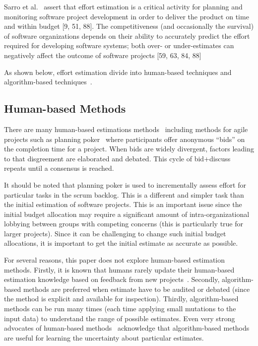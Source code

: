 \documentclass[10pt,conference]{IEEEtran}
\begin{document}
Sarro et al.~\cite{sarro2016multi} assert that effort  estimation  is  a  critical  activity  for  planning  and
monitoring software project development in order to deliver
the  product  on  time  and  within  budget  [9,  51,  88].   The
competitiveness (and occasionally the survival) of software
organizations depends on their ability to accurately predict
the  effort  required  for  developing  software  systems;  both
over- or under-estimates can negatively affect the outcome
of software projects [59, 63, 84, 88]

As shown below, effort estimation divide into human-based techniques and algorithm-based techniques~\cite{teak2012,shepperd2007software}.

\subsection{Human-based Methods}

There  are many human-based estimations methods~\cite{Jorgensen2004} including methods for agile projects such as planning poker~\cite{molokk08} where participants offer anonymous “bids” on the completion time for a project. When bids are widely divergent, factors leading to that disgreement are elaborated and debated. This cycle of bid+discuss repeats until a consensus
is reached.

It should be noted that  planning poker is
used to incrementally assess effort for particular tasks in the scrum backlog.
This is a  different and simpler task than the
initial
estimation of software projects. This is an important issue since
the initial budget allocation may require a significant amount of intra-organizational lobbying between groups with competing concerns (this is particularly true for larger projects). 
Since it can be challenging to change such initial budget allocations, it is important
to get the initial estimate as accurate as possible.

For several reasons, this paper does not explore human-based  estimation methods.
Firstly,   it is known that humans rarely update their human-based estimation knowledge
based on feedback from new projects~\cite{jorgensen2009impact}.
Secondly, algorithm-based methods are preferred when   estimate have to be audited or debated
(since the  method is explicit and   available for inspection). 
Thirdly, algorithm-based methods can be run many times (each time applying small mutations to the input data)
to understand the range of possible estimates.
Even very strong
advocates of human-based methods~\cite{jorg2015a} acknowledge that algorithm-based methods are useful for learning
the
uncertainty
about particular estimates.
\end{document}
